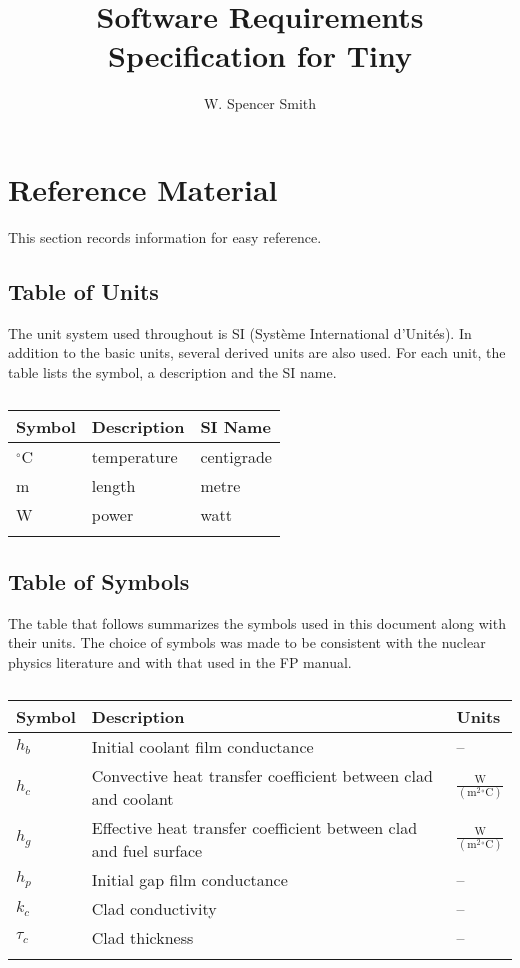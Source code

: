 \documentclass[12pt]{article}
\title{Software Requirements Specification for Tiny}
\author{W. Spencer Smith}
\begin{document}
\maketitle
\tableofcontents
\newpage
\section{Reference Material}
\label{Sec:RefMat}
This section records information for easy reference.
\subsection{Table of Units}
\label{Sec:ToU}
The unit system used throughout is SI (Système International d'Unités). In addition to the basic units, several derived units are also used. For each unit, the table lists the symbol, a description and the SI name.
\begin{longtable}{l l l}
\toprule
Symbol & Description & SI Name
\\
\midrule
\endhead
${}^{\circ}$C & temperature & centigrade
\\
m & length & metre
\\
W & power & watt
\\
\bottomrule
\caption{}
\label{Table:ToU}
\end{longtable}
\subsection{Table of Symbols}
\label{Sec:ToS}
The table that follows summarizes the symbols used in this document along with their units. The choice of symbols was made to be consistent with the nuclear physics literature and with that used in the FP manual.
\begin{longtabu}{l X[l] l}
\toprule
Symbol & Description & Units
\\
\midrule
\endhead
${h_{b}}$ & Initial coolant film conductance & --
\\
${h_{c}}$ & Convective heat transfer coefficient between clad and coolant & $\frac{\text{W}}{(\text{m}^{2}{}^{\circ}\text{C})}$
\\
${h_{g}}$ & Effective heat transfer coefficient between clad and fuel surface & $\frac{\text{W}}{(\text{m}^{2}{}^{\circ}\text{C})}$
\\
${h_{p}}$ & Initial gap film conductance & --
\\
${k_{c}}$ & Clad conductivity & --
\\
${τ_{c}}$ & Clad thickness & --
\\
\bottomrule
\caption{}
\label{Table:ToS}
\end{longtabu}
\end{document}

